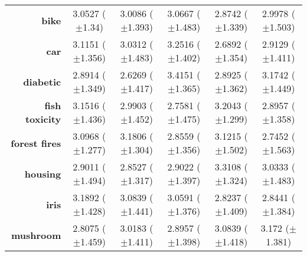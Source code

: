 \begin{table}[htbp]
{\begin{tabular}{r|ccccc}
			\textbf{bike}                & \cellcolor[rgb]{ .98,  .537,  .447}3.0527 ($\pm$1.34)   & \cellcolor[rgb]{ 1,  .922,  .518}3.0086 ($\pm$1.393)    & \cellcolor[rgb]{ .973,  .412,  .42}3.0667 ($\pm$1.483)  & \cellcolor[rgb]{ .388,  .745,  .482}2.8742 ($\pm$1.339) & \cellcolor[rgb]{ .949,  .906,  .514}2.9978 ($\pm$1.503) \\
			\textbf{car}                 & \cellcolor[rgb]{ .992,  .729,  .482}3.1151 ($\pm$1.356) & \cellcolor[rgb]{ 1,  .922,  .518}3.0312 ($\pm$1.483)    & \cellcolor[rgb]{ .973,  .412,  .42}3.2516 ($\pm$1.402)  & \cellcolor[rgb]{ .388,  .745,  .482}2.6892 ($\pm$1.354) & \cellcolor[rgb]{ .788,  .859,  .502}2.9129 ($\pm$1.411) \\
			\textbf{diabetic}            & \cellcolor[rgb]{ .996,  .918,  .514}2.8914 ($\pm$1.349) & \cellcolor[rgb]{ .388,  .745,  .482}2.6269 ($\pm$1.417) & \cellcolor[rgb]{ .973,  .412,  .42}3.4151 ($\pm$1.365)  & \cellcolor[rgb]{ 1,  .922,  .518}2.8925 ($\pm$1.362)    & \cellcolor[rgb]{ .988,  .647,  .467}3.1742 ($\pm$1.449) \\
			\textbf{fish toxicity}       & \cellcolor[rgb]{ .98,  .541,  .447}3.1516 ($\pm$1.436)  & \cellcolor[rgb]{ 1,  .922,  .518}2.9903 ($\pm$1.452)    & \cellcolor[rgb]{ .388,  .745,  .482}2.7581 ($\pm$1.475) & \cellcolor[rgb]{ .973,  .412,  .42}3.2043 ($\pm$1.299)  & \cellcolor[rgb]{ .749,  .847,  .502}2.8957 ($\pm$1.358) \\
			\textbf{forest fires}        & \cellcolor[rgb]{ 1,  .922,  .518}3.0968 ($\pm$1.277)    & \cellcolor[rgb]{ .973,  .412,  .42}3.1806 ($\pm$1.304)  & \cellcolor[rgb]{ .58,  .8,  .49}2.8559 ($\pm$1.356)     & \cellcolor[rgb]{ .992,  .773,  .49}3.1215 ($\pm$1.502)  & \cellcolor[rgb]{ .388,  .745,  .482}2.7452 ($\pm$1.563) \\
			\textbf{housing}             & \cellcolor[rgb]{ .984,  .918,  .514}2.9011 ($\pm$1.494) & \cellcolor[rgb]{ .388,  .745,  .482}2.8527 ($\pm$1.317) & \cellcolor[rgb]{ 1,  .922,  .518}2.9022 ($\pm$1.397)    & \cellcolor[rgb]{ .973,  .412,  .42}3.3108 ($\pm$1.324)  & \cellcolor[rgb]{ .992,  .761,  .486}3.0333 ($\pm$1.483) \\
			\textbf{iris}                & \cellcolor[rgb]{ .973,  .412,  .42}3.1892 ($\pm$1.428)  & \cellcolor[rgb]{ .996,  .827,  .502}3.0839 ($\pm$1.441) & \cellcolor[rgb]{ 1,  .922,  .518}3.0591 ($\pm$1.376)    & \cellcolor[rgb]{ .388,  .745,  .482}2.8237 ($\pm$1.409) & \cellcolor[rgb]{ .439,  .757,  .482}2.8441 ($\pm$1.384) \\
			\textbf{mushroom}            & \cellcolor[rgb]{ .388,  .745,  .482}2.8075 ($\pm$1.459) & \cellcolor[rgb]{ 1,  .922,  .518}3.0183 ($\pm$1.411)    & \cellcolor[rgb]{ .643,  .816,  .494}2.8957 ($\pm$1.398) & \cellcolor[rgb]{ .992,  .706,  .478}3.0839 ($\pm$1.418) & \cellcolor[rgb]{ .973,  .412,  .42}3.172 ($\pm$1.381)   \\

\end{tabular}}
\end{table}
